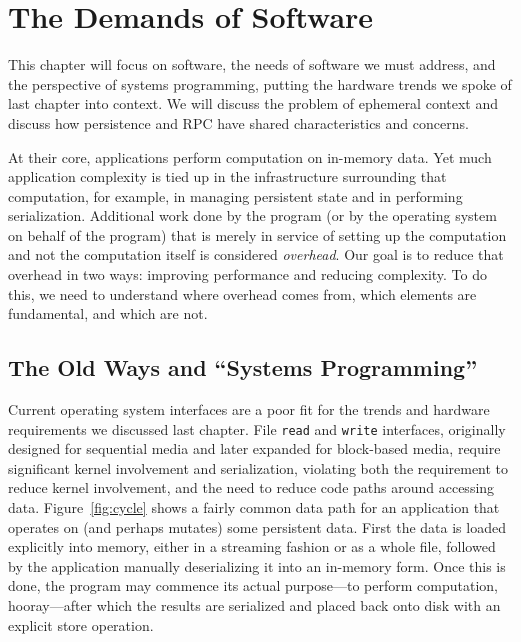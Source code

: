 
\chapter{The Demands of Software}\label{ch:softwaredemands}

\begin{chabstract}
    This chapter will focus on software, the needs of software we must address, and the perspective of systems
    programming, putting the hardware trends we spoke of last chapter into context. We will discuss the problem of
    ephemeral context and discuss how persistence and RPC have shared characteristics and concerns.
\end{chabstract}

At their core, applications perform computation on in-memory data. Yet much application complexity is tied up in the
infrastructure surrounding that computation, for example, in managing persistent state and in performing serialization.
Additional work done by the program (or by the operating system on behalf of the program) that is merely in service of
setting up the computation and not the computation itself is considered \emph{overhead}. Our goal is to
reduce that overhead in two ways: improving performance and reducing complexity. To do this, we need to understand where
overhead comes from, which elements are fundamental, and which are not.

\section{The Old Ways and ``Systems Programming''}

Current operating system interfaces are a poor fit for the trends and hardware requirements we discussed last chapter.
File \texttt{read} and \texttt{write} interfaces, originally designed for sequential media and later expanded for
block-based media, require significant kernel involvement and serialization, violating both the requirement to reduce
kernel involvement, and the need to reduce code paths around accessing data. Figure~\ref{fig:cycle} shows a fairly
common data path for an application that operates on (and perhaps mutates) some persistent data. First the data is
loaded explicitly into memory, either in a streaming fashion or as a whole file, followed by the application manually
deserializing it into an in-memory form. Once this is done, the program may commence its actual purpose---to perform
computation, hooray---after which the results are serialized and placed back onto disk with an explicit store operation.

